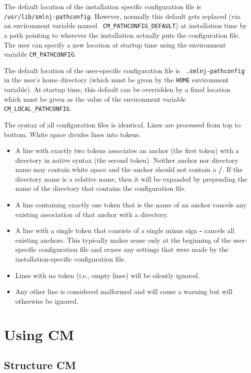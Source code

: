 \documentclass{article}
\begin{document}
The default location of the installation specific configuration file
is {\tt /usr/lib/smlnj-pathconfig}.  However, normally this default
gets replaced (via an environment variable named {\tt
CM\_PATHCONFIG\_DEFAULT}) at installation time by a path pointing to
wherever the installation actually puts the configuration file.
The user can specify a new location at startup time using the
environment variable {\tt CM\_PATHCONFIG}.

The default location of the user-specific configuration file is {\tt
.smlnj-pathconfig} in the user's home directory (which must be given
by the {\tt HOME} environment variable).  At startup time, this
default can be overridden by a fixed location which must be given as
the value of the environment variable {\tt CM\_LOCAL\_PATHCONFIG}.

The syntax of all configuration files is identical.  Lines are
processed from top to bottom. White space divides lines into tokens.
\begin{itemize}
\item A line with exactly two tokens associates an anchor (the first
token) with a directory in native syntax (the second token).  Neither
anchor nor directory name may contain white space and the anchor
should not contain a {\bf /}.  If the directory name is a relative
name, then it will be expanded by prepending the name of the directory
that contains the configuration file.
\item A line containing exactly one token that is the name of an
anchor cancels any existing association of that anchor with a
directory.
\item A line with a single token that consists of a single minus sign
{\bf -} cancels all existing anchors.  This typically makes sense only
at the beginning of the user-specific configuration file and
erases any settings that were made by the installation-specific
configuration file.
\item Lines with no token (i.e., empty lines) will be silently ignored.
\item Any other line is considered malformed and will cause a warning
but will otherwise be ignored.
\end{itemize}

\section{Using CM}

\subsection{Structure CM}
\label{sec:api}
\end{document}
